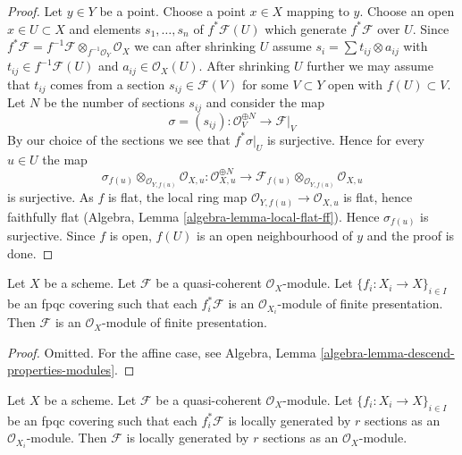 \begin{proof}
Let $y \in Y$ be a point. Choose a point $x \in X$ mapping to $y$.
Choose an open $x \in U \subset X$ and elements $s_1, \ldots, s_n$
of $f^*\mathcal{F}(U)$ which generate $f^*\mathcal{F}$ over $U$.
Since $f^*\mathcal{F} =
f^{-1}\mathcal{F} \otimes_{f^{-1}\mathcal{O}_Y} \mathcal{O}_X$
we can after shrinking $U$ assume $s_i = \sum t_{ij} \otimes a_{ij}$
with $t_{ij} \in f^{-1}\mathcal{F}(U)$ and $a_{ij} \in \mathcal{O}_X(U)$.
After shrinking $U$ further we may assume that $t_{ij}$ comes from
a section $s_{ij} \in \mathcal{F}(V)$ for some $V \subset Y$ open
with $f(U) \subset V$. Let $N$ be the number of sections $s_{ij}$ and
consider the map
$$
\sigma = (s_{ij}) : \mathcal{O}_V^{\oplus N} \to \mathcal{F}|_V
$$
By our choice of the sections we see that $f^*\sigma|_U$ is surjective.
Hence for every $u \in U$ the map
$$
\sigma_{f(u)} \otimes_{\mathcal{O}_{Y, f(u)}} \mathcal{O}_{X, u} :
\mathcal{O}_{X, u}^{\oplus N}
\longrightarrow
\mathcal{F}_{f(u)} \otimes_{\mathcal{O}_{Y, f(u)}} \mathcal{O}_{X, u}
$$
is surjective. As $f$ is flat, the local ring map
$\mathcal{O}_{Y, f(u)} \to \mathcal{O}_{X, u}$ is flat, hence
faithfully flat (Algebra, Lemma \ref{algebra-lemma-local-flat-ff}).
Hence $\sigma_{f(u)}$ is surjective. Since $f$ is open, $f(U)$ is
an open neighbourhood of $y$ and the proof is done.
\end{proof}

\begin{lemma}
\label{lemma-finite-presentation-descends}
Let $X$ be a scheme.
Let $\mathcal{F}$ be a quasi-coherent $\mathcal{O}_X$-module.
Let $\{f_i : X_i \to X\}_{i \in I}$ be an fpqc covering such that
each $f_i^*\mathcal{F}$ is an $\mathcal{O}_{X_i}$-module of finite
presentation. Then $\mathcal{F}$ is an $\mathcal{O}_X$-module
of finite presentation.
\end{lemma}

\begin{proof}
Omitted. For the affine case, see
Algebra, Lemma \ref{algebra-lemma-descend-properties-modules}.
\end{proof}

\begin{lemma}
\label{lemma-locally-generated-by-r-sections-descends}
Let $X$ be a scheme.
Let $\mathcal{F}$ be a quasi-coherent $\mathcal{O}_X$-module.
Let $\{f_i : X_i \to X\}_{i \in I}$ be an fpqc covering such that
each $f_i^*\mathcal{F}$ is locally generated by $r$ sections as an
$\mathcal{O}_{X_i}$-module. Then $\mathcal{F}$ is locally generated by
$r$ sections as an $\mathcal{O}_X$-module.
\end{lemma}

